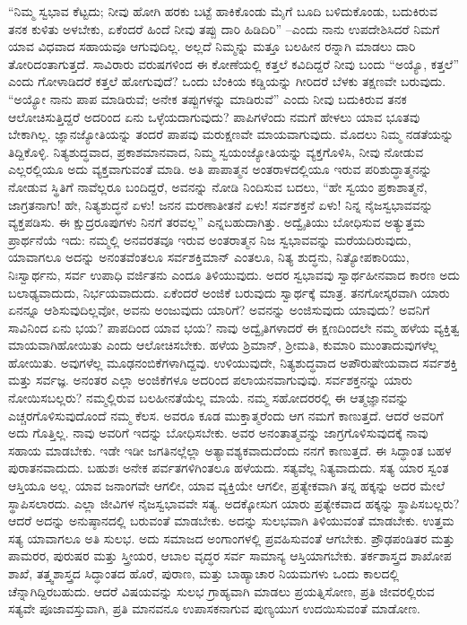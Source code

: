 “ನಿಮ್ಮ ಸ್ವಭಾವ ಕೆಟ್ಟದು; ನೀವು ಹೋಗಿ ಹರಕು ಬಟ್ಟೆ ಹಾಕಿಕೊಂಡು ಮೈಗೆ ಬೂದಿ ಬಳಿದುಕೊಂಡು, ಬದುಕಿರುವ ತನಕ ಕುಳಿತು ಅಳಬೇಕು, ಏಕೆಂದರೆ ಹಿಂದೆ ನೀವು ತಪ್ಪು ದಾರಿ ಹಿಡಿದಿರಿ” –ಎಂದು ನಾನು ಉಪದೇಶಿಸಿದರೆ ನಿಮಗೆ ಯಾವ ವಿಧವಾದ ಸಹಾಯವೂ ಆಗುವುದಿಲ್ಲ. ಅಲ್ಲದೆ ನಿಮ್ಮನ್ನು ಮತ್ತೂ ಬಲಹೀನ ರನ್ನಾಗಿ ಮಾಡಲು ದಾರಿ ತೋರಿದಂತಾಗುತ್ತದೆ. ಸಾವಿರಾರು ವರುಷಗಳಿಂದ ಈ ಕೋಣೆಯಲ್ಲಿ ಕತ್ತಲೆ ಕವಿದಿದ್ದರೆ ನೀವು ಬಂದು “ಅಯ್ಯೊ, ಕತ್ತಲೆ” ಎಂದು ಗೋಳಾಡಿದರೆ ಕತ್ತಲೆ ಹೋಗುವುದೆ? ಒಂದು ಬೆಂಕಿಯ ಕಡ್ಡಿಯನ್ನು ಗೀರಿದರೆ ಬೆಳಕು ತಕ್ಷಣವೇ ಬರುವುದು. “ಅಯ್ಯೋ ನಾನು ಪಾಪ ಮಾಡಿರುವೆ; ಅನೇಕ ತಪ್ಪುಗಳನ್ನು ಮಾಡಿರುವೆ” ಎಂದು ನೀವು ಬದುಕಿರುವ ತನಕ ಆಲೋಚಿಸುತ್ತಿದ್ದರೆ ಅದರಿಂದ ಏನು ಒಳ್ಳೆಯದಾಗುವುದು? ಪಾಪಿಗಳೆಂದು ನಮಗೆ ಹೇಳಲು ಯಾವ ಭೂತವು ಬೇಕಾಗಿಲ್ಲ. ಜ್ಞಾನಜ್ಯೋತಿಯನ್ನು ತಂದರೆ ಪಾಪವು ಮರುಕ್ಷಣವೇ ಮಾಯವಾಗುವುದು. ಮೊದಲು ನಿಮ್ಮ ನಡತೆಯನ್ನು ತಿದ್ದಿಕೊಳ್ಳಿ. ನಿತ್ಯಶುದ್ಧವಾದ, ಪ್ರಕಾಶಮಾನವಾದ, ನಿಮ್ಮ ಸ್ವಯಂಜ್ಯೋತಿಯನ್ನು ವ್ಯಕ್ತಗೊಳಿಸಿ, ನೀವು ನೋಡುವ ಎಲ್ಲರಲ್ಲಿಯೂ ಅದು ವ್ಯಕ್ತವಾಗುವಂತೆ ಮಾಡಿ. ಅತಿ ಪಾಪಾತ್ಮನ ಅಂತರಾಳದಲ್ಲಿಯೂ ಇರುವ ಪರಿಶುದ್ಧಾತ್ಮನನ್ನು ನೋಡುವ ಸ್ಥಿತಿಗೆ ನಾವೆಲ್ಲರೂ ಬಂದಿದ್ದರೆ, ಅವನನ್ನು ನೋಡಿ ನಿಂದಿಸುವ ಬದಲು, “ಹೇ ಸ್ವಯಂ ಪ್ರಕಾಶಾತ್ಮನೆ, ಜಾಗ್ರತನಾಗು! ಹೇ, ನಿತ್ಯಶುದ್ಧನೆ ಏಳು! ಜನನ ಮರಣಾತೀತನೆ ಏಳು! ಸರ್ವಶಕ್ತನೆ ಏಳು! ನಿನ್ನ ನೈಜಸ್ವಭಾವವನ್ನು ವ್ಯಕ್ತಪಡಿಸು. ಈ ಕ್ಷುದ್ರರೂಪುಗಳು ನಿನಗೆ ತರವಲ್ಲ” ಎನ್ನಬಹುದಾಗಿತ್ತು. ಅದ್ವೈತಿಯು ಬೋಧಿಸುವ ಅತ್ಯುತ್ತಮ ಪ್ರಾರ್ಥನೆಯೆ ಇದು: ನಮ್ಮಲ್ಲಿ ಅನವರತವೂ ಇರುವ ಅಂತರಾತ್ಮನ ನಿಜ ಸ್ವಭಾವವನ್ನು ಮರೆಯದಿರುವುದು, ಯಾವಾಗಲೂ ಅದನ್ನು ಅನಂತವೆಂತಲೂ ಸರ್ವಶಕ್ತಿಮಾನ್​ ಎಂತಲೂ, ನಿತ್ಯ ಶುದ್ಧನು, ನಿತ್ಯೋಪಕಾರಿಯು, ನಿಃಸ್ವಾರ್ಥನು, ಸರ್ವ ಉಪಾಧಿ ವರ್ಜಿತನು ಎಂದೂ ತಿಳಿಯುವುದು. ಅದರ ಸ್ವಭಾವವು ಸ್ವಾರ್ಥಹೀನವಾದ ಕಾರಣ ಅದು ಬಲಾಢ್ಯವಾದುದು, ನಿರ್ಭಯವಾದುದು. ಏಕೆಂದರೆ ಅಂಜಿಕೆ ಬರುವುದು ಸ್ವಾರ್ಥಕ್ಕೆ ಮಾತ್ರ. ತನಗೋಸ್ಕರವಾಗಿ ಯಾರು ಏನನ್ನೂ ಆಶಿಸುವುದಿಲ್ಲವೋ, ಅವನು ಅಂಜುವುದು ಯಾರಿಗೆ? ಅವನನ್ನು ಅಂಜಿಸುವುದು ಯಾವುದು? ಅವನಿಗೆ ಸಾವಿನಿಂದ ಏನು ಭಯ? ಪಾಪದಿಂದ ಯಾವ ಭಯ? ನಾವು ಅದ್ವೈತಿಗಳಾದರೆ ಈ ಕ್ಷಣದಿಂದಲೇ ನಮ್ಮ ಹಳೆಯ ವ್ಯಕ್ತಿತ್ವ ಮಾಯವಾಗಿಹೋಯಿತು ಎಂದು ಆಲೋಚಿಸಬೇಕು. ಹಳೆಯ ಶ್ರಿಮಾನ್​, ಶ‍್ರೀಮತಿ, ಕುಮಾರಿ ಮುಂತಾದುವುಗಳೆಲ್ಲ ಹೋಯಿತು. ಅವುಗಳೆಲ್ಲ ಮೂಢನಂಬಿಕೆಗಳಾಗಿದ್ದವು. ಉಳಿಯುವುದೇ, ನಿತ್ಯಶುದ್ಧವಾದ ಅಪೌರುಷೇಯವಾದ ಸರ್ವಶಕ್ತಿ ಮತ್ತು ಸರ್ವಜ್ಞ. ಅನಂತರ ಎಲ್ಲಾ ಅಂಜಿಕೆಗಳೂ ಅದರಿಂದ ಪಲಾಯನವಾಗುವುವು. ಸರ್ವಶಕ್ತನನ್ನು ಯಾರು ನೋಯಿಸಬಲ್ಲರು? ನಮ್ಮಲ್ಲಿರುವ ಬಲಹೀನತೆಯೆಲ್ಲ ಮಾಯೆ. ನಮ್ಮ ಸಹೋದರರಲ್ಲಿ ಈ ಆತ್ಮಜ್ಞಾನವನ್ನು ಎಚ್ಚರಗೊಳಿಸುವುದೊಂದೆ ನಮ್ಮ ಕೆಲಸ. ಅವರೂ ಕೂಡ ಮುಕ್ತಾತ್ಮರೆಂದು ಆಗ ನಮಗೆ ಕಾಣುತ್ತದೆ. ಆದರೆ ಅವರಿಗೆ ಅದು ಗೊತ್ತಿಲ್ಲ. ನಾವು ಅವರಿಗೆ ಇದನ್ನು ಬೋಧಿಸಬೇಕು. ಅವರ ಅನಂತಾತ್ಮವನ್ನು ಜಾಗ್ರಗೊಳಿಸುವುದಕ್ಕೆ ನಾವು ಸಹಾಯ ಮಾಡಬೇಕು. ಇಡೇ ಇಡೀ ಜಗತಿನಲ್ಲೆಲ್ಲಾ ಅತ್ಯಾವಶ್ಯಕವಾದುದೆಂದು ನನಗೆ ಕಾಣುತ್ತದೆ. ಈ ಸಿದ್ಧಾಂತ ಬಹಳ ಪುರಾತನವಾದುದು. ಬಹುಶಃ ಅನೇಕ ಪರ್ವತಗಳಿಗಿಂತಲೂ ಹಳೆಯದು. ಸತ್ಯವೆಲ್ಲ ನಿತ್ಯವಾದುದು. ಸತ್ಯ ಯಾರ ಸ್ವಂತ ಆಸ್ತಿಯೂ ಅಲ್ಲ. ಯಾವ ಜನಾಂಗವೇ ಆಗಲೀ, ಯಾವ ವ್ಯಕ್ತಿಯೇ ಆಗಲೀ, ಪ್ರತ್ಯೇಕವಾಗಿ ತನ್ನ ಹಕ್ಕನ್ನು ಅದರ ಮೇಲೆ ಸ್ಥಾಪಿಸಲಾರದು. ಎಲ್ಲಾ ಜೀವಿಗಳ ನೈಜಸ್ವಭಾವವೇ ಸತ್ಯ. ಅದಕ್ಕೋಸುಗ ಯಾರು ಪ್ರತ್ಯೇಕವಾದ ಹಕ್ಕನ್ನು ಸ್ಥಾಪಿಸಬಲ್ಲರು? ಆದರೆ ಅದನ್ನು ಅನುಷ್ಠಾನದಲ್ಲಿ ಬರುವಂತೆ ಮಾಡಬೇಕು. ಅದನ್ನು ಸುಲಭವಾಗಿ ತಿಳಿಯುವಂತೆ ಮಾಡಬೇಕು. ಉತ್ತಮ ಸತ್ಯ ಯಾವಾಗಲೂ ಅತಿ ಸುಲಭ. ಅದು ಸಮಾಜದ ಅಂಗಾಂಗಳಲ್ಲಿ ಪ್ರವಹಿಸುವಂತೆ ಆಗಬೇಕು. ಪ್ರೌಢಪಂಡಿತರ ಮತ್ತು ಪಾಮರರ, ಪುರುಷರ ಮತ್ತು ಸ್ತ್ರೀಯರ, ಆಬಾಲ ವೃದ್ಧರ ಸರ್ವ ಸಾಮಾನ್ಯ ಆಸ್ತಿಯಾಗಬೇಕು. ತರ್ಕಶಾಸ್ತ್ರದ ಶಾಖೋಪ ಶಾಖೆ, ತತ್ತ್ವಶಾಸ್ತ್ರದ ಸಿದ್ಧಾಂತದ ಹೊರೆ, ಪುರಾಣ, ಮತ್ತು ಬಾಹ್ಯಾಚಾರ ನಿಯಮಗಳು ಒಂದು ಕಾಲದಲ್ಲಿ ಚೆನ್ನಾಗಿದ್ದಿರಬಹುದು. ಆದರೆ ವಿಷಯವನ್ನು ಸುಲಭ ಗ್ರಾಹ್ಯವಾಗಿ ಮಾಡಲು ಪ್ರಯತ್ನಿಸೋಣ, ಪ್ರತಿ ಜೀವರಲ್ಲಿರುವ ಸತ್ಯವೇ ಪೂಜಾವಸ್ತುವಾಗಿ, ಪ್ರತಿ ಮಾನವನೂ ಉಪಾಸಕನಾಗುವ ಪುಣ್ಯಯುಗ ಉದಯಿಸುವಂತೆ ಮಾಡೋಣ. 

